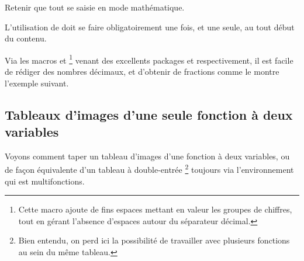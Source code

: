 \begin{tdocnote}
	Retenir que tout se saisie en mode mathématique.
\end{tdocnote}


\begin{tdocwarn}
	L'utilisation de  doit se faire obligatoirement une fois, et une seule, au tout début du contenu.
\end{tdocwarn}




\begin{tdocexa}
    \leavevmode

\end{tdocexa}




\begin{tdocexa}
    \leavevmode

\end{tdocexa}



\begin{tdoctip}
%
    Via les macros  et 
    \footnote{
    	Cette macro ajoute de fins espaces mettant en valeur les groupes de chiffres, tout en gérant l'absence d'espaces autour du séparateur décimal.
    }
    venant des excellents packages  et  respectivement, il est facile de rédiger des nombres décimaux, et d'obtenir de  fractions comme le montre l'exemple suivant.

\end{tdoctip}



\subsection{Tableaux d'images d'une seule fonction à deux variables}

Voyons comment taper un tableau d'images d'une fonction à deux variables, ou de façon équivalente d'un tableau à double-entrée
\footnote{
	Bien entendu, on perd ici la possibilité de travailler avec plusieurs fonctions au sein du même tableau.
}
toujours via l'environnement  qui est multifonctions.


